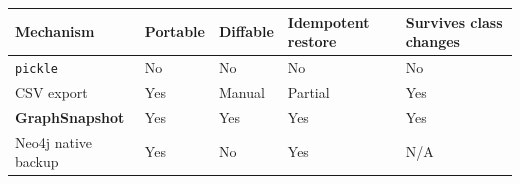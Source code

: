 \begin{table}[h]
\small\centering
\begin{tabular}{lllll}
\toprule
Mechanism & Portable & Diffable & Idempotent restore & Survives class changes \\
\midrule
\texttt{pickle} & No & No & No & No \\
CSV export & Yes & Manual & Partial & Yes \\
\textbf{GraphSnapshot} & Yes & Yes & Yes & Yes \\
Neo4j native backup & Yes & No & Yes & N/A \\
\bottomrule
\end{tabular}
\end{table}
